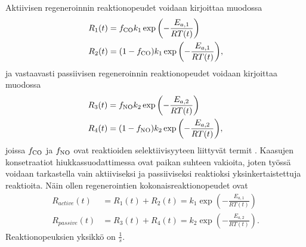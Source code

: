 Aktiivisen regeneroinnin reaktionopeudet voidaan kirjoittaa muodossa
\begin{align}
    R_1(t) &= f_{\ce{CO}} k_1 \exp{\left( -\frac{E_{a, 1}}{RT(t)} \right)} \\%
    R_2(t) &= (1-f_{\ce{CO}}) k_1 \exp{\left( -\frac{E_{a, 1}}{RT(t)} \right)} ,%
\end{align}
ja vastaavasti passiivisen regeneroinnin reaktionopeudet voidaan kirjoittaa muodossa
\begin{align}
    R_3(t) &= f_{\ce{NO}} k_2 \exp{\left( -\frac{E_{a, 2}}{RT(t)} \right)} \\%
    R_4(t) &= (1-f_{\ce{NO}}) k_2 \exp{\left( -\frac{E_{a, 2}}{RT(t)} \right)}, %
\end{align}
joissa \( f_{\ce{CO}}\) ja \( f_{\ce{NO}}\) ovat reaktioiden selektiivisyyteen liittyvät termit \cite{ZhongChao2022Eaos} \cite{DengYuanwang2017Iogc}.
Kaasujen konsetraatiot hiukkassuodattimessa ovat paikan suhteen vakioita, joten työssä voidaan tarkastella vain aktiiviseksi ja passiiviseksi reaktioksi yksinkertaistettuja reaktioita.
Näin ollen regenerointien kokonaisreaktionopeudet ovat
\begin{align}
    R_{active}(t) &= R_1(t) + R_2(t) =   k_1 \exp{\left( -\frac{E_{a, 1}}{RT(t)} \right)} \\%
    R_{passive}(t) &= R_3(t)+ R_4(t) =  k_2 \exp{\left( -\frac{E_{a, 2}}{RT(t)} \right)} . %
\end{align}
Reaktionopeuksien yksikkö on \(\frac{1}{s}\).

